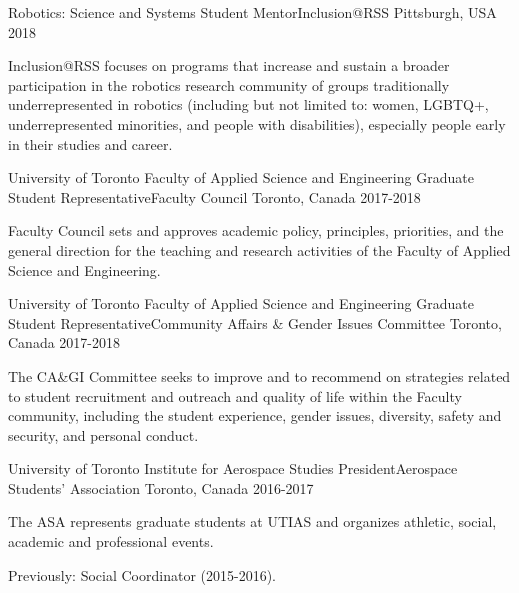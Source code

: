 \begin{cventries}
  \cventry
    {Robotics: Science and Systems} %
    {Student Mentor{\enskip\cdotp\enskip}Inclusion@RSS} %
    {Pittsburgh, USA} %
    {2018} %
    {
      \begin{cvitems} %
        \item {Inclusion@RSS focuses on programs that increase and sustain a broader participation in the robotics research community of groups traditionally underrepresented in robotics (including but not limited to: women, LGBTQ+, underrepresented minorities, and people with disabilities), especially people early in their studies and career.}
      \end{cvitems}
    }

  \cventry
    {University of Toronto Faculty of Applied Science and Engineering} %
    {Graduate Student Representative{\enskip\cdotp\enskip}Faculty Council} %
    {Toronto, Canada} %
    {2017-2018} %
    {
      \begin{cvitems} %
        \item {Faculty Council sets and approves academic policy, principles, priorities, and the general direction for the teaching and research activities of the Faculty of Applied Science and Engineering.}
      \end{cvitems}
    }

  \cventry
    {University of Toronto Faculty of Applied Science and Engineering} %
    {Graduate Student Representative{\enskip\cdotp\enskip}Community Affairs \& Gender Issues Committee} %
    {Toronto, Canada} %
    {2017-2018} %
    {
      \begin{cvitems} %
        \item {The CA\&GI Committee seeks to improve and to recommend on strategies related to student recruitment and outreach and quality of life within the Faculty community, including the student experience, gender issues, diversity, safety and security, and personal conduct.}
      \end{cvitems}
    }

  \cventry
    {University of Toronto Institute for Aerospace Studies} %
    {President{\enskip\cdotp\enskip}Aerospace Students' Association} %
    {Toronto, Canada} %
    {2016-2017} %
    {
      \begin{cvitems} %
        \item {The ASA represents graduate students at UTIAS and organizes athletic, social, academic and professional events.}
        \item{Previously: Social Coordinator (2015-2016).}
      \end{cvitems}
    }
  

\end{cventries}
